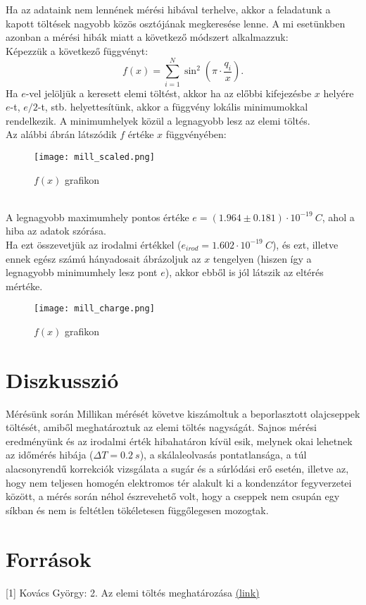 \documentclass[a4paper]{article}
\begin{document}
Ha az adataink nem lennének mérési hibával terhelve, akkor a feladatunk a kapott töltések nagyobb közös osztójának megkeresése lenne. A mi esetünkben azonban a mérési hibák miatt a következő módszert alkalmazzuk:\\
Képezzük a következő függvényt:
\begin{equation}
f(x)=\sum_{i=1}^N \sin^2\left(\pi\cdot\frac{q_i}{x}\right).
\end{equation}
Ha $e$-vel jelöljük a keresett elemi töltést, akkor ha az előbbi kifejezésbe $x$ helyére $e$-t, $e/2$-t, stb. helyettesítünk, akkor a függvény lokális minimumokkal rendelkezik. A minimumhelyek közül a legnagyobb lesz az elemi töltés.\\
Az alábbi ábrán látszódik $f$ értéke $x$ függvényében:
\begin{figure}[h!]\centering
	\caption{$f(x)$ grafikon}
	\texttt{[image: mill\_scaled.png]}
\end{figure}\\
A legnagyobb maximumhely pontos értéke $e=(1.964\pm0.181)\cdot 10^{-19}\ C$, ahol a hiba az adatok szórása.\\
Ha ezt összevetjük az irodalmi értékkel ($e_{irod}=1.602\cdot 10^{-19}\ C$), és ezt, illetve ennek egész számú hányadosait ábrázoljuk az $x$ tengelyen (hiszen így a legnagyobb minimumhely lesz pont $e$), akkor ebből is jól látszik az eltérés mértéke.
\begin{figure}[h!]\centering
	\caption{$f(x)$ grafikon}
	\texttt{[image: mill\_charge.png]}
\end{figure}

\section{Diszkusszió}
Mérésünk során Millikan mérését követve kiszámoltuk a beporlasztott olajcseppek töltését, amiből meghatároztuk az elemi töltés nagyságát. Sajnos mérési eredményünk és az irodalmi érték hibahatáron kívül esik, melynek okai lehetnek az időmérés hibája ($\Delta T=0.2\ s$), a skálaleolvasás pontatlansága, a túl alacsonyrendű korrekciók vizsgálata a sugár és a súrlódási erő esetén, illetve az, hogy nem teljesen homogén elektromos tér alakult ki a kondenzátor fegyverzetei között, a mérés során néhol észrevehető volt, hogy a cseppek nem csupán egy síkban és nem is feltétlen tökéletesen függőlegesen mozogtak.

\section{Források}
[1] Kovács György: 2. Az elemi töltés meghatározása
\href{http://wigner.elte.hu/koltai/labor/parts/modern2.pdf}{(link)}
\end{document}
